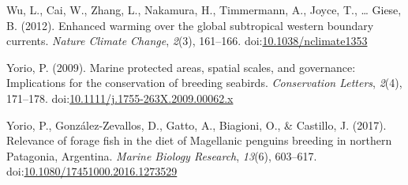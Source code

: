 \documentclass[
]{article}
\newlength{\cslhangindent}
\newlength{\cslentryspacingunit} %
\newenvironment{CSLReferences}[2] %
 {%
  \setlength{\parindent}{0pt}
  \ifodd #1
  \let\oldpar\par
  \def\par{\hangindent=\cslhangindent\oldpar}
  \fi
  \setlength{\parskip}{#2\cslentryspacingunit}
 }%
 {}
\begin{document}
\begin{CSLReferences}{1}{0}
\leavevmode{}%
Wu, L., Cai, W., Zhang, L., Nakamura, H., Timmermann, A., Joyce, T.,
\ldots{} Giese, B. (2012). Enhanced warming over the global subtropical
western boundary currents. \emph{Nature Climate Change}, \emph{2}(3),
161--166.
doi:\href{https://doi.org/10.1038/nclimate1353}{10.1038/nclimate1353}

\leavevmode{}%
Yorio, P. (2009). Marine protected areas, spatial scales, and
governance: Implications for the conservation of breeding seabirds.
\emph{Conservation Letters}, \emph{2}(4), 171--178.
doi:\href{https://doi.org/10.1111/j.1755-263X.2009.00062.x}{10.1111/j.1755-263X.2009.00062.x}

\leavevmode{}%
Yorio, P., González-Zevallos, D., Gatto, A., Biagioni, O., \& Castillo,
J. (2017). Relevance of forage fish in the diet of {Magellanic} penguins
breeding in northern {Patagonia}, {Argentina}. \emph{Marine Biology
Research}, \emph{13}(6), 603--617.
doi:\href{https://doi.org/10.1080/17451000.2016.1273529}{10.1080/17451000.2016.1273529}

\end{CSLReferences}
\end{document}
